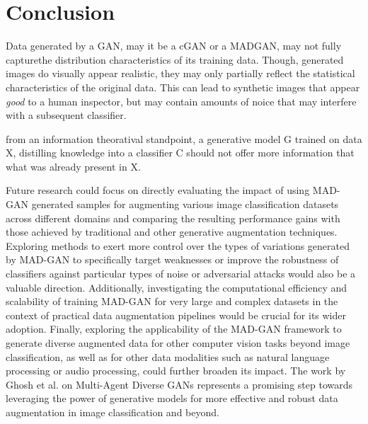 \section{Conclusion}\label{conclusion}

Data generated by a GAN, may it be a cGAN or a MADGAN, may not fully capturethe distribution characteristics of its training data. Though, generated images do visually appear realistic, they may only partially reflect the statistical characteristics of the original data. This can lead to synthetic images that appear \textit{good} to a human inspector, but may contain amounts of noice that may interfere with a subsequent classifier.

from an information theoratival standpoint, a generative model G trained on data X, distilling knowledge into a classifier C should not offer more information that what was already present in X.


Future research could focus on directly evaluating the impact of using MAD-GAN generated samples for augmenting various image classification datasets across different domains and comparing the resulting performance gains with those achieved by traditional and other generative augmentation techniques. Exploring methods to exert more control over the types of variations generated by MAD-GAN to specifically target weaknesses or improve the robustness of classifiers against particular types of noise or adversarial attacks would also be a valuable direction. Additionally, investigating the computational efficiency and scalability of training MAD-GAN for very large and complex datasets in the context of practical data augmentation pipelines would be crucial for its wider adoption. Finally, exploring the applicability of the MAD-GAN framework to generate diverse augmented data for other computer vision tasks beyond image classification, as well as for other data modalities such as natural language processing or audio processing, could further broaden its impact. The work by Ghosh et al. on Multi-Agent Diverse GANs represents a promising step towards leveraging the power of generative models for more effective and robust data augmentation in image classification and beyond.
